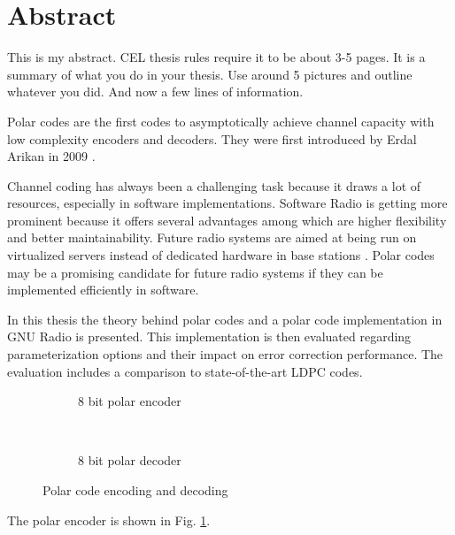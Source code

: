 \chapter*{Abstract}
This is my abstract.
CEL thesis rules require it to be about 3-5 pages. 
It is a summary of what you do in your thesis.
Use around 5 pictures and outline whatever you did.
And now a few lines of information.


Polar codes are the first codes to asymptotically achieve channel capacity with low complexity encoders and decoders.
They were first introduced by Erdal Arikan in 2009 \cite{polar:arikan09}.

Channel coding has always been a challenging task because it draws a lot of resources, especially in software implementations.
Software Radio is getting more prominent because it offers several advantages among which are higher flexibility and better maintainability.
Future radio systems are aimed at being run on virtualized servers instead of dedicated hardware in base stations \cite{cloudran:2015}.
Polar codes may be a promising candidate for future radio systems if they can be implemented efficiently in software.

In this thesis the theory behind polar codes and a polar code implementation in GNU Radio is presented.
This implementation is then evaluated regarding parameterization options and their impact on error correction performance.
The evaluation includes a comparison to state-of-the-art \ac{LDPC} codes.


\begin{figure}[!htb]
  \begin{subfigure}[t]{.49\textwidth}
    \begin{center}
      \def\dist{1.5}
      \def\power{3}
      
      \caption{8 bit polar encoder}
      \label{abs:polar_8bit_encoder_natural}
    \end{center}
  \end{subfigure}\,%
  \begin{subfigure}[t]{.49\textwidth}
    \begin{center}
      \def\dist{1.5}
      \def\power{3}
      
      \caption{8 bit polar decoder}
      \label{abs:polar_8bit_decoder}
    \end{center}
  \end{subfigure}%
  \caption{Polar code encoding and decoding}
  \label{abs:encoder-decoder}
\end{figure}

The polar encoder is shown in Fig. \ref{abs:polar_8bit_encoder_natural}.

